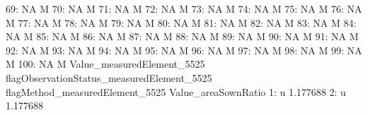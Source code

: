 \documentclass[nojss]{jss}
\begin{document}
\begin{Schunk}
\begin{Soutput}
 69:                         NA                                          M
 70:                         NA                                          M
 71:                         NA                                          M
 72:                         NA                                          M
 73:                         NA                                          M
 74:                         NA                                          M
 75:                         NA                                          M
 76:                         NA                                          M
 77:                         NA                                          M
 78:                         NA                                          M
 79:                         NA                                          M
 80:                         NA                                          M
 81:                         NA                                          M
 82:                         NA                                          M
 83:                         NA                                          M
 84:                         NA                                          M
 85:                         NA                                          M
 86:                         NA                                          M
 87:                         NA                                          M
 88:                         NA                                          M
 89:                         NA                                          M
 90:                         NA                                          M
 91:                         NA                                          M
 92:                         NA                                          M
 93:                         NA                                          M
 94:                         NA                                          M
 95:                         NA                                          M
 96:                         NA                                          M
 97:                         NA                                          M
 98:                         NA                                          M
 99:                         NA                                          M
100:                         NA                                          M
     Value_measuredElement_5525 flagObservationStatus_measuredElement_5525
     flagMethod_measuredElement_5525 Value_areaSownRatio
  1:                               u            1.177688
  2:                               u            1.177688

\end{Soutput}
\end{Schunk}
\end{document}
